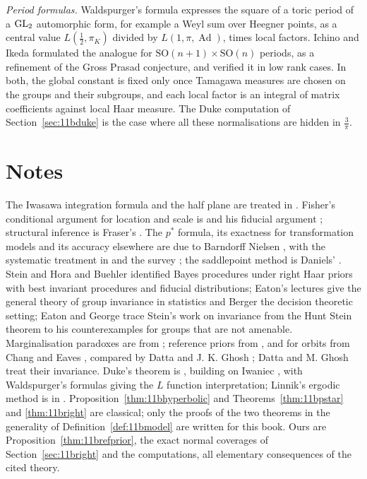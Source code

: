 \emph{Period formulas.} Waldspurger's formula \cite{waldspurger1985} expresses the square of a toric period of a $\mathrm{GL}_2$ automorphic form, for example a Weyl sum over Heegner points, as a central value $L(\frac12,\pi_K)$ divided by $L(1,\pi,\operatorname{Ad})$, times local factors. Ichino and Ikeda \cite{ichinoikeda2010} formulated the analogue for $\mathrm{SO}(n+1)\times\mathrm{SO}(n)$ periods, as a refinement of the Gross Prasad conjecture, and verified it in low rank cases. In both, the global constant is fixed only once Tamagawa measures are chosen on the groups and their subgroups, and each local factor is an integral of matrix coefficients against local Haar measure. The Duke computation of Section~\ref{sec:11bduke} is the case where all these normalisations are hidden in $\frac3\pi$.

\section{Notes}

The Iwasawa integration formula and the half plane are treated in \cite{bump1997}. Fisher's conditional argument for location and scale is \cite{fisher1934} and his fiducial argument \cite{fisher1935}; structural inference is Fraser's \cite{fraser1968}. The $p^*$ formula, its exactness for transformation models and its accuracy elsewhere are due to Barndorff Nielsen \cite{barndorffnielsen1980,barndorffnielsen1983}, with the systematic treatment in \cite{barndorffnielsencox1994} and the survey \cite{reid1988}; the saddlepoint method is Daniels' \cite{daniels1954}. Stein \cite{stein1965} and Hora and Buehler \cite{horabuehler1966} identified Bayes procedures under right Haar priors with best invariant procedures and fiducial distributions; Eaton's lectures \cite{eaton1989} give the general theory of group invariance in statistics and Berger \cite{berger1985} the decision theoretic setting; Eaton and George \cite{eatongeorge2021} trace Stein's work on invariance from the Hunt Stein theorem to his counterexamples for groups that are not amenable. Marginalisation paradoxes are from \cite{dawidstonezidek1973}; reference priors from \cite{bernardo1979,bergerbernardo1992}, and for orbits from Chang and Eaves \cite{changeaves1990}, compared by Datta and J. K. Ghosh \cite{dattaghosh1995}; Datta and M. Ghosh \cite{dattaghosh1996} treat their invariance. Duke's theorem is \cite{duke1988}, building on Iwaniec \cite{iwaniec1987}, with Waldspurger's formulas \cite{waldspurger1981,waldspurger1985} giving the $L$ function interpretation; Linnik's ergodic method is in \cite{linnik1968}. Proposition~\ref{thm:11bhyperbolic} and Theorems~\ref{thm:11bpstar} and \ref{thm:11bright} are classical; only the proofs of the two theorems in the generality of Definition~\ref{def:11bmodel} are written for this book. Ours are Proposition~\ref{thm:11brefprior}, the exact normal coverages of Section~\ref{sec:11bright} and the computations, all elementary consequences of the cited theory.

